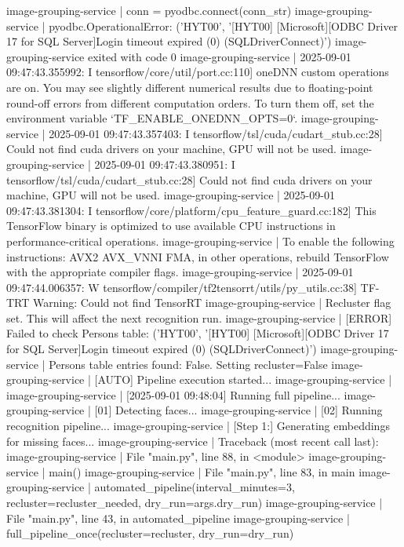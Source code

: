 image-grouping-service  |     conn = pyodbc.connect(conn_str)
image-grouping-service  | pyodbc.OperationalError: ('HYT00', '[HYT00] [Microsoft][ODBC Driver 17 for SQL Server]Login timeout expired (0) (SQLDriverConnect)')
image-grouping-service exited with code 0
image-grouping-service  | 2025-09-01 09:47:43.355992: I tensorflow/core/util/port.cc:110] oneDNN custom operations are on. You may see slightly different numerical results due to floating-point round-off errors from different computation orders. To turn them off, set the environment variable `TF_ENABLE_ONEDNN_OPTS=0`.
image-grouping-service  | 2025-09-01 09:47:43.357403: I tensorflow/tsl/cuda/cudart_stub.cc:28] Could not find cuda drivers on your machine, GPU will not be used.
image-grouping-service  | 2025-09-01 09:47:43.380951: I tensorflow/tsl/cuda/cudart_stub.cc:28] Could not find cuda drivers on your machine, GPU will not be used.
image-grouping-service  | 2025-09-01 09:47:43.381304: I tensorflow/core/platform/cpu_feature_guard.cc:182] This TensorFlow binary is optimized to use available CPU instructions in performance-critical operations.
image-grouping-service  | To enable the following instructions: AVX2 AVX_VNNI FMA, in other operations, rebuild TensorFlow with the appropriate compiler flags.
image-grouping-service  | 2025-09-01 09:47:44.006357: W tensorflow/compiler/tf2tensorrt/utils/py_utils.cc:38] TF-TRT Warning: Could not find TensorRT
image-grouping-service  | Recluster flag set. This will affect the next recognition run.
image-grouping-service  | [ERROR] Failed to check Persons table: ('HYT00', '[HYT00] [Microsoft][ODBC Driver 17 for SQL Server]Login timeout expired (0) (SQLDriverConnect)')
image-grouping-service  | Persons table entries found: False. Setting recluster=False
image-grouping-service  | [AUTO] Pipeline execution started...
image-grouping-service  |
image-grouping-service  | [2025-09-01 09:48:04] Running full pipeline...
image-grouping-service  | [01] Detecting faces...
image-grouping-service  | [02] Running recognition pipeline...
image-grouping-service  | [Step 1:] Generating embeddings for missing faces...
image-grouping-service  | Traceback (most recent call last):
image-grouping-service  |   File "main.py", line 88, in <module>
image-grouping-service  |     main()
image-grouping-service  |   File "main.py", line 83, in main
image-grouping-service  |     automated_pipeline(interval_minutes=3, recluster=recluster_needed, dry_run=args.dry_run)
image-grouping-service  |   File "main.py", line 43, in automated_pipeline
image-grouping-service  |     full_pipeline_once(recluster=recluster, dry_run=dry_run)
